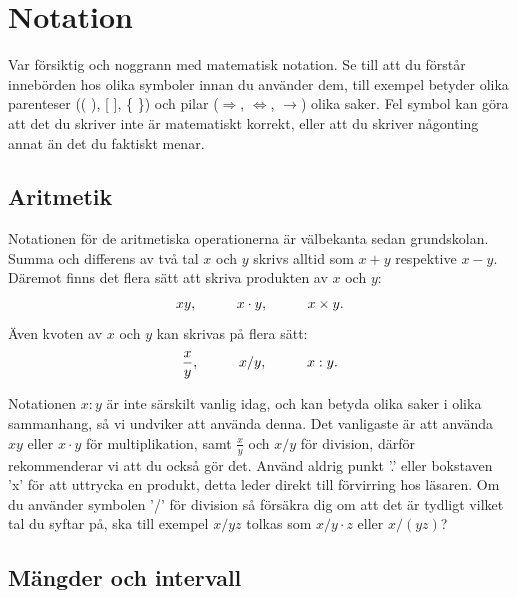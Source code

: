 \documentclass[titlepage]{article}
\begin{document}


\section{Notation}\label{ch3}

Var försiktig och noggrann med matematisk notation. Se till att du förstår innebörden hos olika symboler innan du använder dem, till exempel betyder olika parenteser (( ), [ ], \{ \}) och pilar ($\Rightarrow$, $\Leftrightarrow$, $\to$) olika saker. Fel symbol kan göra att det du skriver inte är matematiskt korrekt, eller att du skriver någonting annat än det du faktiskt menar.




\subsection{Aritmetik}

Notationen för de aritmetiska operationerna är välbekanta sedan grundskolan. Summa och differens av två tal $x$ och $y$ skrivs alltid som $x+y$ respektive $x-y$. Däremot finns det flera sätt att skriva produkten av $x$ och $y$:
$$xy, \hspace{10mm} x\cdot y, \hspace{10mm} x \times y.$$
Även kvoten av $x$ och $y$ kan skrivas på flera sätt:
$$\frac{x}{y}, \hspace{10mm} x/y, \hspace{10mm}  x : y.$$

Notationen $x:y$ är inte särskilt vanlig idag, och kan betyda olika saker i olika sammanhang, så vi undviker att använda denna. Det vanligaste är att använda $xy$ eller $x \cdot y$ för multiplikation, samt $\frac{x}{y}$ och $x/y$ för division, därför rekommenderar vi att du också gör det. Använd aldrig punkt '.' eller bokstaven 'x' för att uttrycka en produkt, detta leder direkt till förvirring hos läsaren. Om du använder symbolen '/' för division så försäkra dig om att det är tydligt vilket tal du syftar på, ska till exempel $x/yz$ tolkas som $x/y\cdot z$ eller $x/(yz)$?





\subsection{Mängder och intervall}
\end{document}
